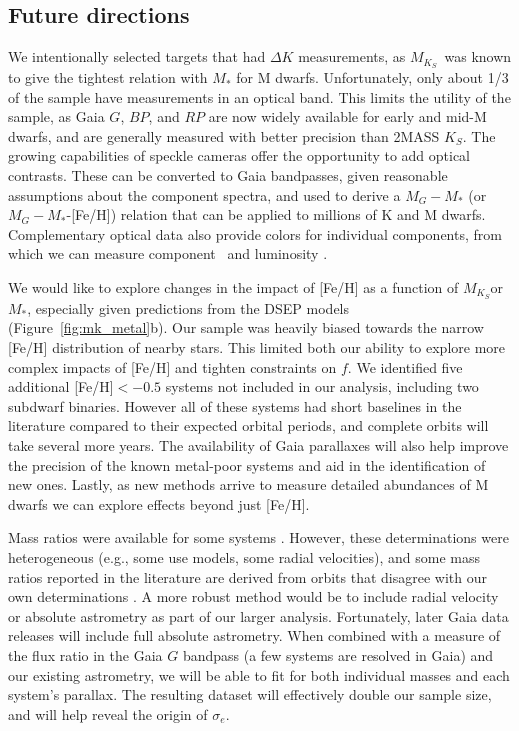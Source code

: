 \documentclass[twocolumn]{aastex62}
\newcommand{\mks}{$M_{K_S}$}
\begin{document}
\subsection{Future directions}

We intentionally selected targets that had $\Delta K$ measurements, as \mks\ was known to give the tightest relation with $M_*$ for M dwarfs. Unfortunately, only about 1/3 of the sample have measurements in an optical band. This limits the utility of the sample, as Gaia $G$, $BP$, and $RP$ are now widely available for early and mid-M dwarfs, and are generally measured with better precision than 2MASS $K_S$. The growing capabilities of speckle cameras \citep[e.g.,][]{2009AJ....137.5057H} offer the opportunity to add optical contrasts. These can be converted to Gaia bandpasses, given reasonable assumptions about the component spectra, and used to derive a $M_{G}-M_*$ (or $M_G-M_*$-[Fe/H]) relation that can be applied to millions of K and M dwarfs. Complementary optical data also provide colors for individual components, from which we can measure component \teff\ and luminosity \citep[e.g.,][]{2017ApJ...845...72K}.

We would like to explore changes in the impact of [Fe/H] as a function of \mks or $M_*$, especially given predictions from the DSEP models (Figure~\ref{fig:mk_metal}b). Our sample was heavily biased towards the narrow [Fe/H] distribution of nearby stars. This limited both our ability to explore more complex impacts of [Fe/H] and tighten constraints on $f$. We identified five additional [Fe/H]$<-0.5$ systems not included in our analysis, including two subdwarf binaries. However all of these systems had short baselines in the literature compared to their expected orbital periods, and complete orbits will take several more years. The availability of Gaia parallaxes will also help improve the precision of the known metal-poor systems and aid in the identification of new ones. Lastly, as new methods arrive to measure detailed abundances of M dwarfs \citep{Veyette2016a,Veyette2017} we can explore effects beyond just [Fe/H]. %

Mass ratios were available for some systems  \citep[e.g.,][]{Soderhjelm1999,Mlg2007b,Dupuy2017}. However, these determinations were heterogeneous (e.g., some use models, some radial velocities), and some mass ratios reported in the literature are derived from orbits that disagree with our own determinations \citep[e.g.,][]{Koh2012}. A more robust method would be to include radial velocity or absolute astrometry as part of our larger analysis. Fortunately, later Gaia data releases will include full absolute astrometry. When combined with a measure of the flux ratio in the Gaia $G$ bandpass (a few systems are resolved in Gaia) and our existing astrometry, we will be able to fit for both individual masses and each system's parallax. The resulting dataset will effectively double our sample size, and will help reveal the origin of $\sigma_e$. 
\end{document}
